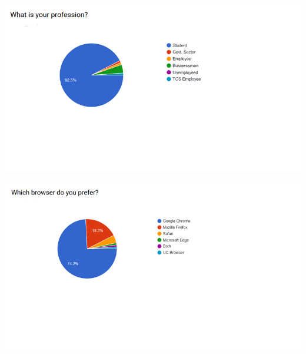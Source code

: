 \documentclass[12pt]{article}
\begin{document}
  \includegraphics[width=\linewidth]{srs12.png}
  
  \includegraphics[width=\linewidth]{srs13.png}
  
  
  
\end{document}
